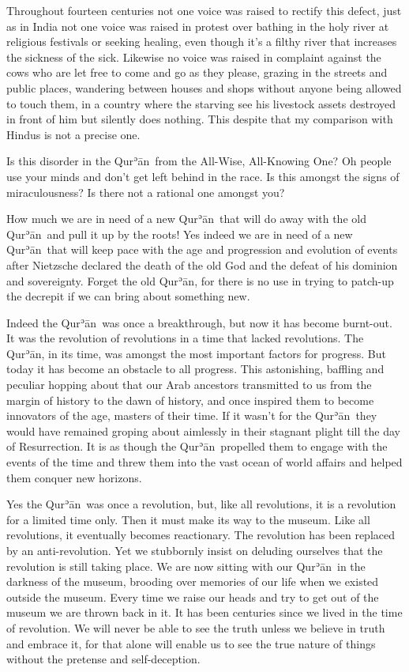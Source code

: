 \documentclass[12pt]{memoir}
\def\´{ʾ} %
\def \Quran{Qur\-\´ān} %
\def\–{-\hskip0pt}
\begin{document}
Throughout fourteen centuries not one voice was raised to rectify this defect,
just as in India not one voice was raised in protest
over bathing in the holy river at religious festivals or seeking healing,
even though it’s a filthy river that increases the sickness of the sick.
Likewise no voice was raised in complaint against the cows who are let free
to come and go as they please, grazing in the streets and public places,
wandering between houses and shops without anyone being allowed to touch them,
in a country where the starving see his livestock assets
destroyed in front of him but silently does nothing.
This despite that my comparison with Hindus is not a precise one.

Is this disorder in the \Quran\ from the All\–Wise, All\–Knowing One?
Oh people use your minds and don’t get left behind in the race.
Is this amongst the signs of miraculousness?
Is there not a rational one amongst you?

How much we are in need of a new \Quran\ that will do away
with the old \Quran\ and pull it up by the roots!
Yes indeed we are in need of a new \Quran\ that will keep pace with the age
and progression and evolution of events after Nietzsche declared the death
of the old God and the defeat of his dominion and sovereignty.
Forget the old \Quran, for there is no use in trying to patch-up
the decrepit if we can bring about something new.

Indeed the \Quran\ was once a breakthrough, but now it has become burnt-out.
It was the revolution of revolutions in a time that lacked revolutions.
The \Quran, in its time, was amongst the most important factors for progress.
But today it has become an obstacle to all progress.
This astonishing, baffling and peculiar hopping about that our Arab ancestors
transmitted to us from the margin of history to the dawn of history,
and once inspired them to become innovators of the age, masters of their time.
If it wasn’t for the \Quran\ they would have remained groping about
aimlessly in their stagnant plight till the day of Resurrection.
It is as though the \Quran\ propelled them to engage with the events
of the time and threw them into the vast ocean of world affairs
and helped them conquer new horizons.

Yes the \Quran\ was once a revolution, but, like all revolutions,
it is a revolution for a limited time only.
Then it must make its way to the museum.
Like all revolutions, it eventually becomes reactionary.
The revolution has been replaced by an anti\–revolution.
Yet we stubbornly insist on deluding ourselves
that the revolution is still taking place.
We are now sitting with our \Quran\ in the darkness of the museum,
brooding over memories of our life when we existed outside the museum.
Every time we raise our heads and try to get out of the museum
we are thrown back in it.
It has been centuries since we lived in the time of revolution.
We will never be able to see the truth unless
we believe in truth and embrace it,
for that alone will enable us to see the true nature of things
without the pretense and self\–deception.
\end{document}
